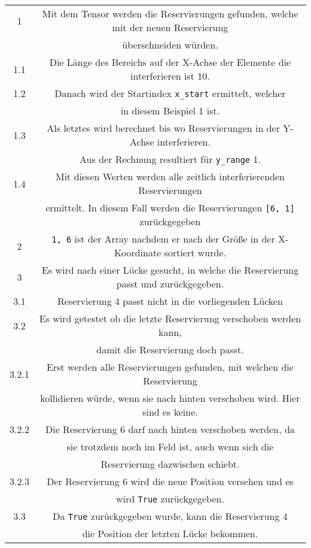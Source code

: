 \begin{table}[H]
    \centering
    \begin{tabular}{|c|c|}
        \hline
        1 & Mit dem Tensor werden die Reservierungen gefunden, welche mit der neuen Reservierung \\& überschneiden würden.\\ \hline
        1.1 & Die Länge des Bereichs auf der X-Achse der Elemente die interferieren ist 10.\\ \hline
        1.2 & Danach wird der Startindex \texttt{x\_start} ermittelt, welcher \\& in diesem Beispiel 1 ist. \\ \hline
        1.3 & Als letztes wird berechnet bis wo Reservierungen in der Y-Achse interferieren. \\&Aus der Rechnung resultiert für \texttt{y\_range} 1. \\ \hline
        1.4 & Mit diesen Werten werden alle zeitlich interferierenden Reservierungen \\& ermittelt. In diesem Fall werden die Reservierungen \texttt{[6, 1]} zurückgegeben \\ \hline
        2 & \texttt{1, 6} ist der Array nachdem er nach der Größe in der X-Koordinate sortiert wurde.\\ \hline
        3 & Es wird nach einer Lücke gesucht, in welche die Reservierung passt und zurückgegeben. \\ \hline
        3.1 & Reservierung 4 passt nicht in die vorliegenden Lücken \\ \hline
        3.2 & Es wird getestet ob die letzte Reservierung verschoben werden kann, \\& damit die Reservierung doch passt. \\ \hline
        3.2.1 & Erst werden alle Reservierungen gefunden, mit welchen die Reservierung \\& kollidieren würde, wenn sie nach hinten verschoben wird. Hier sind es keine.\\ \hline
        3.2.2 & Die Reservierung 6 darf nach hinten verschoben werden, da \\& sie trotzdem noch im Feld ist, auch wenn sich die \\& Reservierung dazwischen schiebt. \\ \hline
        3.2.3 & Der Reservierung 6 wird die neue Position versehen und es \\& wird \texttt{True} zurückgegeben. \\ \hline
        3.3 & Da \texttt{True} zurückgegeben wurde, kann die Reservierung 4 \\& die Position der letzten Lücke bekommen.\\ \hline

\end{tabular}
\end{table}

